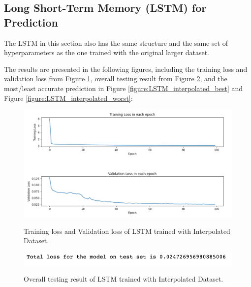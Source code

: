 \subsection{Long Short-Term Memory (LSTM) for Prediction}

The LSTM in this section also has the same structure and the same set of hyperparameters as the one trained with the original larger dataset.

The results are presented in the following figures, including the training loss and validation loss from Figure \ref{figure:LSTM_interpolated_losses}, overall testing result from Figure \ref{figure:LSTM_interpolated_testing}, and the most/least accurate prediction in Figure \ref{figure:LSTM_interpolated_best} and Figure \ref{figure:LSTM_interpolated_worst}:


\begin{figure}[H]
    \caption{Training loss and Validation loss of LSTM trained with Interpolated Dataset.}
    \includegraphics[scale=0.6]{figures/mantle_convection_images/larger_dataset_interpolated/LSTM_trainingData.png}
    \label{figure:LSTM_interpolated_losses}
\end{figure}

\begin{figure}[H]
    \caption{Overall testing result of LSTM trained with Interpolated Dataset.}
    \includegraphics[scale=0.8]{figures/mantle_convection_images/larger_dataset_interpolated/LSTM_OverallTesting.png}
    \label{figure:LSTM_interpolated_testing}
\end{figure}

